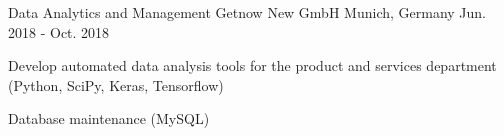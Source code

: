\begin{cventries}

\cventry
{Data Analytics and Management} %
{Getnow New GmbH} %
{Munich, Germany} %
{Jun. 2018 - Oct. 2018} %
{ %
\begin{cvitems}
\item {Develop automated data analysis tools for the product and services department (Python, SciPy, Keras, Tensorflow)}
\item {Database maintenance (MySQL)}
\end{cvitems}
}

\end{cventries}
